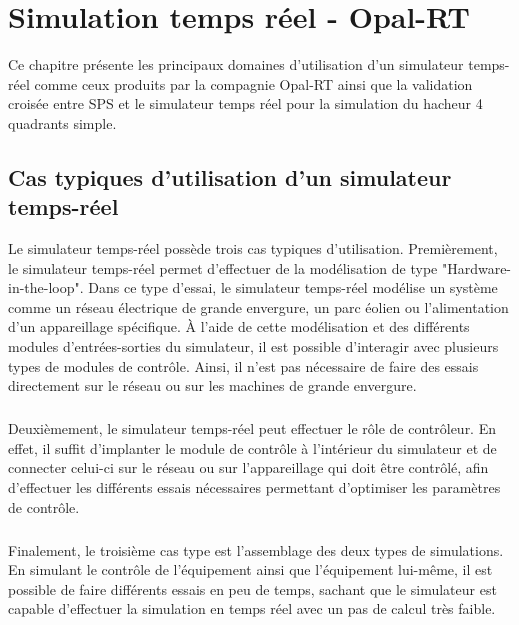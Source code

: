\chapter{Simulation temps réel - Opal-RT}
Ce chapitre présente les principaux domaines d'utilisation d'un simulateur temps-réel comme ceux produits par la compagnie Opal-RT ainsi que la validation croisée entre SPS et le simulateur temps réel pour la simulation du hacheur 4 quadrants simple.

\section{Cas typiques d'utilisation d'un simulateur temps-réel}
Le simulateur temps-réel possède trois cas typiques d'utilisation. Premièrement, le simulateur temps-réel permet d'effectuer de la modélisation de type "Hardware-in-the-loop". Dans ce type d'essai, le simulateur temps-réel modélise un système comme un réseau électrique de grande envergure, un parc éolien ou l'alimentation d'un appareillage spécifique. À l'aide de cette modélisation et des différents modules d'entrées-sorties du simulateur, il est possible d'interagir avec plusieurs types de modules de contrôle. Ainsi, il n'est pas nécessaire de faire des essais directement sur le réseau ou sur les machines de grande envergure.

\paragraph{} Deuxièmement, le simulateur temps-réel peut effectuer le rôle de contrôleur. En effet, il suffit d'implanter le module de contrôle à l'intérieur du simulateur et de connecter celui-ci sur le réseau ou sur l'appareillage qui doit être contrôlé, afin d'effectuer les différents essais nécessaires permettant d'optimiser les paramètres de contrôle.
\paragraph{} Finalement, le troisième cas type est l'assemblage des deux types de simulations. En simulant le contrôle de l'équipement ainsi que l'équipement lui-même, il est possible de faire différents essais en peu de temps, sachant que le simulateur est capable d'effectuer la simulation en temps réel avec un pas de calcul très faible.

